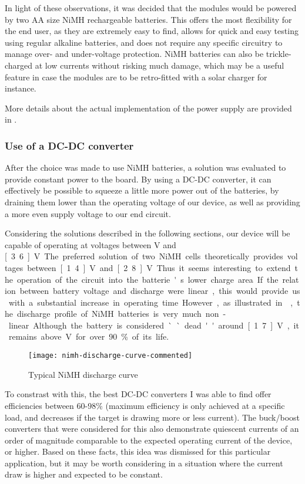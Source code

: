 In light of these observations, it was decided that the modules would be powered
by two AA size NiMH rechargeable batteries. This offers the most flexibility for
the end user, as they are extremely easy to find, allows for quick and easy
testing using regular alkaline batteries, and does not require any specific
circuitry to manage over- and under-voltage protection. NiMH batteries can also
be trickle-charged at low currents without risking much damage, which may be a
useful feature in case the modules are to be retro-fitted with a solar charger
for instance.

More details about the actual implementation of the power supply are provided in
.

\subsubsection{Use of a DC-DC converter}
After the choice was made to use NiMH batteries, a solution was evaluated to
provide constant power to the board. By using a DC-DC converter, it can
effectively be possible to squeeze a little more power out of the batteries, by
draining them lower than the operating voltage of our device, as well as
providing a more even supply voltage to our end circuit.

Considering the solutions described in the following sections, our device will
be capable of operating at voltages between \unit[2]{V} and \unit[3.6]{V}. The
preferred solution of two NiMH cells theoretically provides voltages between
\unit[1.4]{V} and \unit[2.8]{V}. Thus it seems interesting to extend the
operation of the circuit into the batterie's lower charge area. If the relation
between battery voltage and discharge were linear, this would provide us with a
substantial increase in operating time. However, as illustrated in
, the discharge profile of NiMH batteries is very much
non-linear. Although the battery is considered ``dead'' around \unit[1.7]{V}, it
remains above \unit[2]{V} for over 90\% of its life.

\begin{figure}[!h]
  \begin{center}
    \texttt{[image: nimh-discharge-curve-commented]}
  \end{center}
  \caption{Typical NiMH discharge curve}
  \label{fig:discharge-curve}
\end{figure}


To constrast with this, the best DC-DC converters I was able to find offer
efficiencies between 60-98\% (maximum efficiency is only achieved at a specific
load, and decreases if the target is drawing more or less current). The
buck/boost converters that were considered for this also demonstrate quiescent
currents of an order of magnitude comparable to the expected operating current
of the device, or higher. Based on these facts, this idea was dismissed for this
particular application, but it may be worth considering in a situation where the
current draw is higher and expected to be constant.


